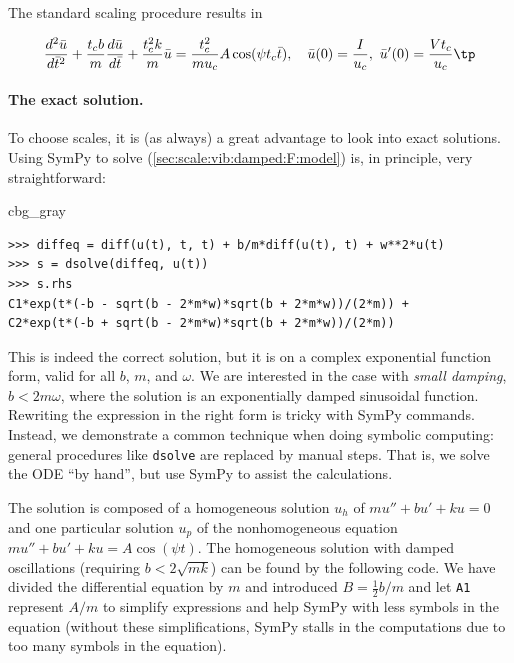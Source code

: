 \documentclass[graybox,envcountchap,sectrefs,final]{svmonodo}
\newenvironment{_cod_tight}[1]{
   \def\FrameCommand{\colorbox{#1}}
   \FrameRule0.6pt\MakeFramed {\FrameRestore}\vskip3mm}
   {\vskip0mm\endMakeFramed}
\newenvironment{cod}[1]{
\bgroup\rmfamily
\fboxsep=0mm\relax
\begin{_cod_tight}{#1}
\list{}{\parsep=-2mm\parskip=0mm\topsep=0pt\leftmargin=2mm
\rightmargin=2\leftmargin\leftmargin=4pt\relax}
\item\relax}
{\endlist\end{_cod_tight}\egroup}
\begin{document}
The standard scaling procedure results in

\begin{equation}
\frac{d^2\bar u}{d\bar t^2} + \frac{t_c b}{m}\frac{d\bar u}{d\bar t}
+ \frac{t_c^2 k}{m}\bar u =
\frac{t_c^2}{mu_c}A\cos(\psi t_c\bar t),
\quad \bar u(0)=\frac{I}{u_c},\ \bar u'(0)=\frac{Vt_c}{u_c}\tp
\label{sec:scale:vib:damped:F:model:scaled0}
\end{equation}

\paragraph{The exact solution.}
To choose scales, it is (as always)
a great advantage to look into exact solutions.
Using SymPy to solve (\ref{sec:scale:vib:damped:F:model}) is, in principle,
very straightforward:

\begin{cod}{cbg_gray}\begin{Verbatim}[numbers=none,fontsize=\fontsize{9pt}{9pt},baselinestretch=0.95,xleftmargin=2mm]
>>> diffeq = diff(u(t), t, t) + b/m*diff(u(t), t) + w**2*u(t)
>>> s = dsolve(diffeq, u(t))
>>> s.rhs
C1*exp(t*(-b - sqrt(b - 2*m*w)*sqrt(b + 2*m*w))/(2*m)) +
C2*exp(t*(-b + sqrt(b - 2*m*w)*sqrt(b + 2*m*w))/(2*m))
\end{Verbatim}
\end{cod}
\noindent
This is indeed the correct solution, but it is on a complex
exponential function form, valid for all $b$, $m$, and $\omega$. We are
interested in the case with \emph{small damping}, $b< 2m\omega$, where the solution
is an exponentially damped sinusoidal function. Rewriting the expression
in the right form is tricky with SymPy commands. Instead, we demonstrate
a common technique when doing symbolic computing: general procedures like
\texttt{dsolve} are replaced by manual steps. That is, we solve the ODE ``by hand'',
but use SymPy to assist the calculations.

The solution is composed of a homogeneous
solution $u_h$ of $mu'' + bu' + ku=0$ and one particular solution $u_p$
of the nonhomogeneous equation
$mu'' + bu' + ku=A\cos(\psi t)$. The homogeneous solution with
damped oscillations (requiring $b < 2\sqrt{mk}$) can be
found by the following code. We have divided the differential equation
by $m$ and introduced $B=\frac{1}{2}b/m$ and let \texttt{A1} represent
$A/m$ to simplify expressions and
help SymPy with less symbols in the equation (without these simplifications,
SymPy stalls in the computations due to too many symbols in the equation).
\end{document}
